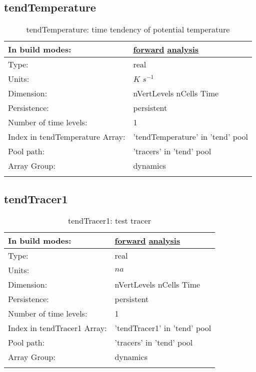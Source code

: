 \subsection[tendTemperature]{tendTemperature}
\label{subsec:var_sec_tend_tendTemperature}
\begin{center}
\begin{longtable}{| p{2.0in} | p{4.0in} |}
        \hline 
        In build modes: & \hyperref[subsec:forward_var_tab_tend]{forward} \hyperref[subsec:analysis_var_tab_tend]{analysis} \\
        \hline 
        Type: & real \\
        \hline 
        Units: & $K$ $s^{-1}$ \\
        \hline 
        Dimension: & nVertLevels nCells Time \\
        \hline 
        Persistence: & persistent \\
        \hline 
        Number of time levels: & 1 \\
        \hline 
		 Index in tendTemperature Array: & 'tendTemperature' in 'tend' pool \\
		 \hline 
            Pool path: & 'tracers' in 'tend' pool
 \\
		 \hline 
		 Array Group: & dynamics \\
		 \hline 
    \caption{tendTemperature: time tendency of potential temperature}
\end{longtable}
\end{center}
\subsection[tendTracer1]{tendTracer1}
\label{subsec:var_sec_tend_tendTracer1}
\begin{center}
\begin{longtable}{| p{2.0in} | p{4.0in} |}
        \hline 
        In build modes: & \hyperref[subsec:forward_var_tab_tend]{forward} \hyperref[subsec:analysis_var_tab_tend]{analysis} \\
        \hline 
        Type: & real \\
        \hline 
        Units: & $na$ \\
        \hline 
        Dimension: & nVertLevels nCells Time \\
        \hline 
        Persistence: & persistent \\
        \hline 
        Number of time levels: & 1 \\
        \hline 
		 Index in tendTracer1 Array: & 'tendTracer1' in 'tend' pool \\
		 \hline 
            Pool path: & 'tracers' in 'tend' pool
 \\
		 \hline 
		 Array Group: & dynamics \\
		 \hline 
    \caption{tendTracer1: test tracer}
\end{longtable}
\end{center}
